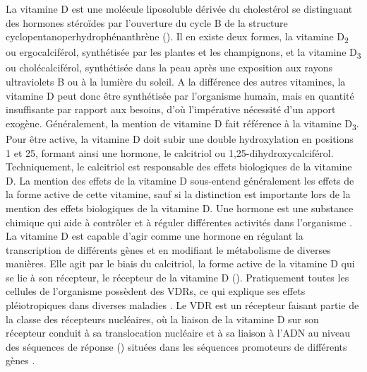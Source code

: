 \documentclass[
  a4paper,
  DIV=11,
  numbers=noendperiod,
  listof=totoc]{scrreprt}
\begin{document}
La vitamine D est une molécule liposoluble dérivée du cholestérol se
distinguant des hormones stéroïdes par l'ouverture du cycle B de la
structure cyclopentanoperhydrophénanthrène \autocite{Norman.2008}
(). Il en existe deux formes, la vitamine
D\textsubscript{2} ou ergocalciférol, synthétisée par les plantes et les
champignons, et la vitamine D\textsubscript{3} ou cholécalciférol,
synthétisée dans la peau après une exposition aux rayons ultraviolets B
ou à la lumière du soleil. A la différence des autres vitamines, la
vitamine D peut donc être synthétisée par l'organisme humain, mais en
quantité insuffisante par rapport aux besoins, d'où l'impérative
nécessité d'un apport exogène. Généralement, la mention de vitamine D
fait référence à la vitamine D\textsubscript{3}. Pour être active, la
vitamine D doit subir une double hydroxylation en positions 1 et 25,
formant ainsi une hormone, le calcitriol ou 1,25-dihydroxycalciférol.
Techniquement, le calcitriol est responsable des effets biologiques de
la vitamine D. La mention des effets de la vitamine D sous-entend
généralement les effets de la forme active de cette vitamine, sauf si la
distinction est importante lors de la mention des effets biologiques de
la vitamine D. Une hormone est une substance chimique qui aide à
contrôler et à réguler différentes activités dans l'organisme
\autocite{Ellison.2021}. La vitamine D est capable d'agir comme une
hormone en régulant la transcription de différents gènes et en modifiant
le métabolisme de diverses manières. Elle agit par le biais du
calcitriol, la forme active de la vitamine D qui se lie à son récepteur,
le récepteur de la vitamine D (). Pratiquement toutes les
cellules de l'organisme possèdent des \acp{VDR}, ce qui explique ses
effets pléiotropiques dans diverses maladies
\autocite{Ellison.2021,Caprio.2017,Norman.2008}. Le \ac{VDR} est un
récepteur faisant partie de la classe des récepteurs nucléaires, où la
liaison de la vitamine D sur son récepteur conduit à sa translocation
nucléaire et à sa liaison à l'ADN au niveau des séquences de réponse
() situées dans les séquences promoteurs de différents gènes
\autocite{Bouillon.2008}.
\end{document}
